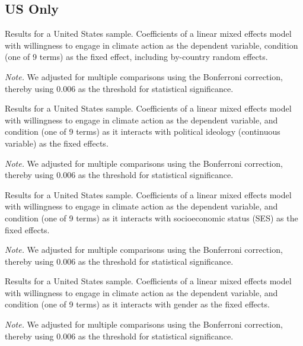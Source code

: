    \subsection{US Only}

\begin{table}[H] 
\caption{Results for a United States sample. Coefficients of a linear mixed effects model with willingness to engage in climate action as the dependent variable, condition (one of 9 terms) as the fixed effect, including by-country random effects. }
 
\end{table}
\textit{Note.} We adjusted for multiple comparisons using the Bonferroni correction, thereby using 0.006 as the threshold for statistical significance.


\begin{table}[H] 
\caption{Results for a United States sample. Coefficients of a linear mixed effects model with willingness to engage in climate action as the dependent variable, and condition (one of 9 terms) as it interacts with political ideology (continuous variable) as the fixed effects.}
 
\end{table}
\textit{Note.} We adjusted for multiple comparisons using the Bonferroni correction, thereby using 0.006 as the threshold for statistical significance.

\begin{table}[H] 
\caption{Results for a United States sample. Coefficients of a linear mixed effects model with willingness to engage in climate action as the dependent variable, and condition (one of 9 terms) as it interacts with socioeconomic status (SES) as the fixed effects.}
 
\end{table}
\textit{Note.} We adjusted for multiple comparisons using the Bonferroni correction, thereby using 0.006 as the threshold for statistical significance.

\begin{table}[H] 
\caption{Results for a United States sample. Coefficients of a linear mixed effects model with willingness to engage in climate action as the dependent variable, and condition (one of 9 terms) as it interacts with gender as the fixed effects. }
 
\end{table}
\textit{Note.} We adjusted for multiple comparisons using the Bonferroni correction, thereby using 0.006 as the threshold for statistical significance.

